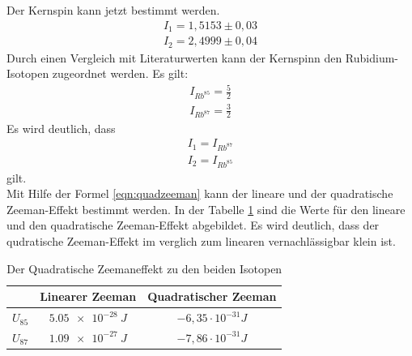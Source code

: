 Der Kernspin kann jetzt bestimmt werden.
\begin{align*}
  I_1=1,5153\pm0,03\\
  I_2=2,4999\pm0,04
\end{align*}
Durch einen Vergleich mit Literaturwerten \cite{Spin} kann der Kernspinn den Rubidium-Isotopen zugeordnet werden.
Es gilt:
\begin{align*}
  I_{Rb^{85}}=\frac{5}{2}\\
  I_{Rb^{87}}=\frac{3}{2}
\end{align*}
Es wird deutlich, dass
\begin{align*}
  I_1=I_{Rb^{87}}\\
  I_2=I_{Rb^{85}}
\end{align*}
gilt.\\

Mit Hilfe der Formel \ref{eqn:quadzeeman} kann der lineare und der quadratische Zeeman-Effekt bestimmt werden.
In der Tabelle \ref{tab.QZ} sind die Werte für den lineare und den quadratische Zeeman-Effekt abgebildet.
Es wird deutlich, dass der qudratische Zeeman-Effekt im verglich zum linearen vernachlässigbar klein ist.
\FloatBarrier

\begin{table}
  \centering
  \caption{Der Quadratische Zeemaneffekt zu den beiden Isotopen}
  \label{tab.QZ}
    \begin{tabular}{c c c}
      \toprule
        & Linearer Zeeman    &Quadratischer Zeeman\\
      \midrule
      \midrule
      $U_{85}$ & $\SI{5.05e-28}{J}$ & $-6,35\cdot 10^{-31}\si{J}$\\
      $U_{87}$ & $\SI{1.09e-27}{J}$ & $-7,86\cdot 10^{-31}\si{J}$\\
      \bottomrule
    \end{tabular}
\end{table}


%
